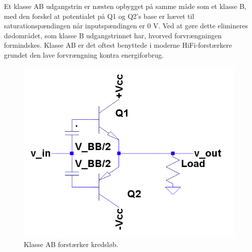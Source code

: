 Et klasse AB udgangstrin er næsten opbygget på samme måde som et klasse B, med den forskel at potentialet på Q1 og Q2's base er hævet til saturationspændingen når inputspændingen er 0 V. Ved at gøre dette elimineres dødområdet, som klasse B udgangstrinnet har, hvorved forvrængningen formindskes. 
Klasse AB er det oftest benyttede i moderne HiFi-forstærkere grundet den lave forvrængning kontra energiforbrug. 

\begin{figure}[h]
\centering
\includegraphics[scale=.35]{indledende_analyse/klasser/classab.png}
\caption{Klasse AB forstærker kredsløb.}
\label{fig:classab}
\end{figure}


